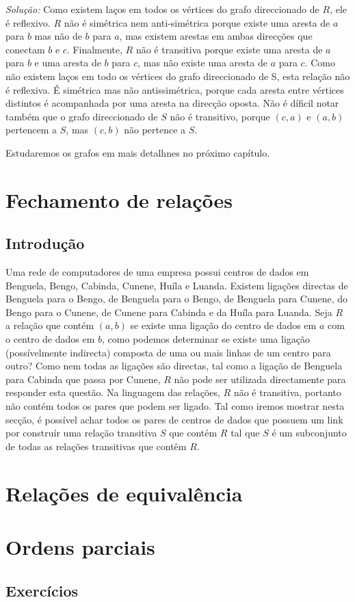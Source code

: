 \emph{Solução:} Como existem laços em todos os vértices do grafo direccionado de $R$, ele é reflexivo. $R$ não é simétrica
nem anti-simétrica porque existe uma aresta de $a$ para $b$ mas não de $b$ para $a$, mas existem arestas em ambas direcções
que conectam $b$ e $c$. Finalmente, $R$ não é transitiva porque existe uma aresta de $a$ para $b$ e uma aresta de $b$ para $c$,
mas não existe uma aresta de $a$ para $c$. Como não existem laços em todo os vértices do grafo direccionado de S, esta relação não é reflexiva. É simétrica
mas não antissimétrica, porque cada aresta entre vértices distintos é acompanhada por uma aresta na direcção oposta. Não é
díficil notar também que o grafo direccionado de $S$ não é transitivo, porque $(c,a)$ e $(a,b)$ pertencem a $S$, mas
$(c,b)$ não pertence a $S$.

Estudaremos os grafos em mais detalhnes no próximo capítulo.


\section{Fechamento de relações}

\subsection{Introdução}

Uma rede de computadores de uma empresa possui centros de dados em Benguela, Bengo, Cabinda, Cunene, Huíla e Luanda.
Existem ligações directas de Benguela para o Bengo, de Benguela para o Bengo, de Benguela para Cunene, do Bengo para o
Cunene, de Cunene para Cabinda e da Huíla para Luanda. Seja $R$ a relação que contém $(a,b)$ se existe uma ligação do 
centro de dados em $a$ com o centro de dados em $b$, como podemos determinar se existe uma ligação (possívelmente indirecta)
composta de uma ou mais linhas de um centro para outro? Como nem todas as ligações são directas, tal como a ligação de
Benguela para Cabinda que passa por Cunene, $R$ não pode ser utilizada directamente para responder esta questão.
Na linguagem das relações, $R$ não é transitiva, portanto não contém todos os pares que podem ser ligado. Tal como iremos
mostrar nesta secção, é possível achar todos os pares de centros de dados que possuem um link por construír
uma relação transitiva $S$ que contém $R$ tal que $S$ é um subconjunto de todas as relações transitivas que contêm $R$.


\section{Relações de equivalência}

\section{Ordens parciais}

\subsection{Exercícios}